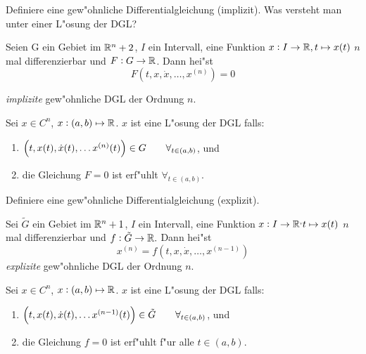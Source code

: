 \documentclass[9pt]{article}
\newcommand{\R}[1]{%
	\ifthenelse{\equal{#1}{}}
		{\mathbb{R}}
		{\mathbb{R}^#1}}%
\newenvironment{field}{}{\newpage}
\newif\ifnote
\newenvironment{note}{\notetrue}{\notefalse}
\newcommand{\localtag}{}
\newcommand{\globaltag}{}
\newcommand{\uuid}{}
\newcommand{\tags}[1]{
    \ifnote 
        \renewcommand{\localtag}{#1}
    \else
        \renewcommand{\globaltag}{#1}
    \fi 
    }
\newcommand{\xplain}[1]{\renewcommand{\uuid}{#1}}
\begin{document}

\tags{mathe2::1sem::GDGL}

\begin{note}
	\xplain{UUID}  %
	\tags{definition, 3.1.1, 3.1.2}
	
	\begin{field}  %
		Definiere  eine gew"ohnliche Differentialgleichung (implizit).
		Was versteht man unter einer L"osung der DGL?
	\end{field}  
	
	\begin{field}  %
		Seien G ein Gebiet im $\R{n+2}$, $I$ ein Intervall, eine Funktion $x: I \rightarrow \R{}, 
		t\mapsto x(t)$ $n$ mal differenzierbar und $F: G \rightarrow \R{}$.
		Dann hei"st
		\begin{equation*}
			F(t,x,\dot{x}, \dots, x^{(n)}) = 0
		\end{equation*}
		
		\textit{implizite} gew"ohnliche DGL der Ordnung $n$. 
		
		Sei $x\in C^n$, $x: (a,b) \mapsto \R{}$.  $x$ ist eine L"osung der DGL falls:
		\begin{enumerate}
			\item $\qty(t,x(t), \dot{x}(t), \dots x^{(n)}(t)) \in G \qquad \forall_{t\in (a,b)}$, und
			\item die Gleichung $F=0$ ist erf"uhlt $\forall_{t\in (a,b)}$.
		\end{enumerate}
	\end{field}
	
	\begin{field}  %
		Definiere  eine gew"ohnliche Differentialgleichung (explizit).
	\end{field}  
	
	\begin{field}  %
				Sei $\tilde{G}$ ein Gebiet im $\R{n+1}$,  $I$ ein Intervall, eine Funktion $x: I \rightarrow \R, 
		t\mapsto x(t)$ $n$ mal differenzierbar und $f: \tilde{G} \rightarrow \R{}.$
		Dann hei"st
		\begin{equation*}
			x^{(n)} = f(t,x,\dot{x}, \dots, x^{(n-1)})
		\end{equation*}
		\textit{explizite}  gew"ohnliche DGL der Ordnung $n$.
		
		Sei $x\in C^n$, $x: (a,b) \mapsto \R{}$.  $x$ ist eine L"osung der DGL falls:
		\begin{enumerate}
			\item $\qty(t,x(t), \dot{x}(t), \dots x^{(n-1)}(t)) \in \tilde{G} \qquad \forall_{t\in (a,b)}$, und
			\item die Gleichung $f=0$ ist erf"uhlt f"ur alle $t\in (a,b)$.
		\end{enumerate}
	\end{field}
\end{note}
\end{document}

